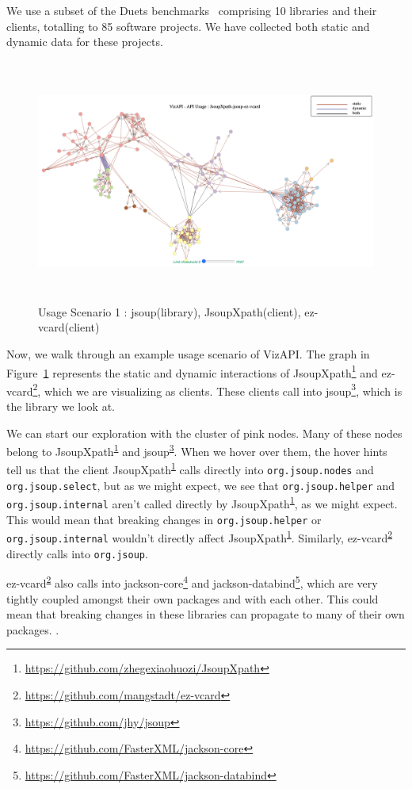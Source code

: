 \label{sec:evaluation}

We use a subset of the Duets benchmarks~\cite{durieux21} comprising 
10 libraries and their clients, totalling to 85 software projects. We have 
collected both static and dynamic data for these projects.

\begin{figure}[h]
\begin{center}
\includegraphics[scale=1,width=18cm,height=8cm]{images/usage-scenario1.png}
\caption{Usage Scenario 1 : jsoup(library), JsoupXpath(client), ez-vcard(client)}
\label{fig:usagescenario1}
\end{center}
\end{figure}

Now, we walk through an example usage scenario of VizAPI.
The graph in Figure~\ref{fig:usagescenario1} represents the static and dynamic interactions of JsoupXpath\footnote{\url{https://github.com/zhegexiaohuozi/JsoupXpath}\label{jsoupxpath}} and ez-vcard\footnote{\url{https://github.com/mangstadt/ez-vcard}\label{ez-vcard}}, which we are visualizing as clients. These clients call into jsoup\footnote{\url{https://github.com/jhy/jsoup}\label{jsoup}}, which is the library we look at.

We can start our exploration with the cluster of pink nodes. Many of these nodes belong to JsoupXpath\textsuperscript{\ref{jsoupxpath}} and jsoup\textsuperscript{\ref{jsoup}}. When we hover over them, the hover hints tell us that the client JsoupXpath\textsuperscript{\ref{jsoupxpath}} calls directly into \texttt{org.jsoup.nodes} and \texttt{org.jsoup.select}, but as we might expect, we see that \texttt{org.jsoup.helper} and \texttt{org.jsoup.internal} aren’t called directly by JsoupXpath\textsuperscript{\ref{jsoupxpath}}, as we might expect. This would mean that breaking changes in \texttt{org.jsoup.helper} or \texttt{org.jsoup.internal} wouldn’t directly affect JsoupXpath\textsuperscript{\ref{jsoupxpath}}. Similarly, ez-vcard\textsuperscript{\ref{ez-vcard}} directly calls into \texttt{org.jsoup}.

ez-vcard\textsuperscript{\ref{ez-vcard}} also calls into jackson-core\footnote{\url{https://github.com/FasterXML/jackson-core}\label{jackson-core}} and jackson-databind\footnote{\url{https://github.com/FasterXML/jackson-databind}\label{jackson-databind}}, which are very tightly coupled amongst their own packages and with each other. This could mean that breaking changes in these libraries can propagate to many of their own packages.
.

